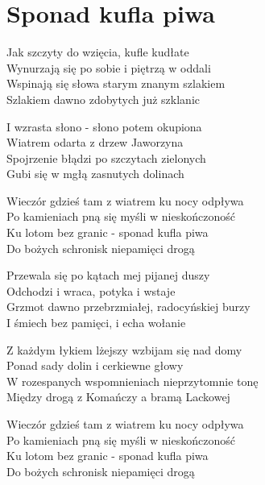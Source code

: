 \section{Sponad kufla piwa}
\begin{text}
Jak szczyty do wzięcia, kufle kudłate\\
Wynurzają się po sobie i piętrzą w oddali\\
Wspinają się słowa starym znanym szlakiem\\
Szlakiem dawno zdobytych już szklanic

I wzrasta słono - słono potem okupiona\\
Wiatrem odarta z drzew Jaworzyna\\
Spojrzenie błądzi po szczytach zielonych\\
Gubi się w mgłą zasnutych dolinach

\vin Wieczór gdzieś tam z wiatrem ku nocy odpływa\\
\vin Po kamieniach pną się myśli w nieskończoność\\
\vin Ku lotom bez granic - sponad kufla piwa\\
\vin Do bożych schronisk niepamięci drogą

Przewala się po kątach mej pijanej duszy\\
Odchodzi i wraca, potyka i wstaje\\
Grzmot dawno przebrzmiałej, radocyńskiej burzy\\
I śmiech bez pamięci, i echa wołanie

Z każdym łykiem lżejszy wzbijam się nad domy\\
Ponad sady dolin i cerkiewne głowy\\
W rozespanych wspomnieniach nieprzytomnie tonę\\
Między drogą z Komańczy a bramą Lackowej

\vin Wieczór gdzieś tam z wiatrem ku nocy odpływa\\
\vin Po kamieniach pną się myśli w nieskończoność\\
\vin Ku lotom bez granic - sponad kufla piwa\\
\vin Do bożych schronisk niepamięci drogą
\end{text}